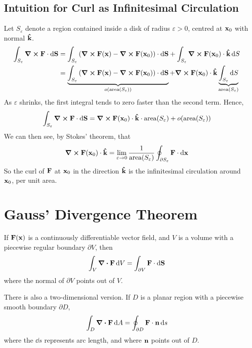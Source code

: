 \documentclass{article}
\begin{document}
\subsection{Intuition for Curl as Infinitesimal Circulation}
Let $S_\varepsilon$ denote a region contained inside a disk of radius $\varepsilon > 0$, centred at $\vb x_0$ with normal $\vu{k}$.
\begin{align*}
	\int_{S_\varepsilon} \curl{\vb F} \cdot \dd{\vb S} & = \int_{S_\varepsilon} \left( \curl{\vb F(\vb x)} - \curl{\vb F(\vb x_0)} \right) \cdot \dd{\vb S} + \int_{S_\varepsilon} \curl{\vb F(\vb x_0)} \cdot \vu k \dd{S}                                                                                        \\
	                                                   & = \underbrace{\int_{S_\varepsilon} \left( \curl{\vb F(\vb x)} - \curl{\vb F(\vb x_0)} \right) \cdot \dd{\vb S}}_{o(\text{area}(S_\varepsilon))} + \curl{\vb F(\vb x_0)} \cdot \vu k \underbrace{\int_{S_\varepsilon} \dd{S}}_{\text{area}(S_\varepsilon)} \\
\end{align*}
As $\varepsilon$ shrinks, the first integral tends to zero faster than the second term. Hence,
\[ \int_{S_\varepsilon} \curl{\vb F} \cdot \dd{\vb S} =  \curl{\vb F(\vb x_0)} \cdot \vu k \cdot \text{area}(S_\varepsilon) + o(\text{area}(S_\varepsilon)) \]
We can then see, by Stokes' theorem, that
\[ \curl{\vb F(\vb x_0)} \cdot \vu k = \lim_{\varepsilon \to 0} \frac{1}{\text{area}(S_\varepsilon)} \oint_{\partial S_\varepsilon} \vb F \cdot \dd{\vb x} \]
So the curl of $\vb F$ at $\vb x_0$ in the direction $\vu k$ is the infinitesimal circulation around $\vb x_0$, per unit area.

\section{Gauss' Divergence Theorem}
\begin{proposition}
	If $\vb F(\vb x)$ is a continuously differentiable vector field, and $V$ is a volume with a piecewise regular boundary $\partial V$, then
	\[ \int_V \div{\vb F} \dd{V} = \int_{\partial V} \vb F \cdot \dd{\vb S} \]
	where the normal of $\partial V$ points out of $V$.
\end{proposition}
\noindent There is also a two-dimensional version. If $D$ is a planar region with a piecewise smooth boundary $\partial D$,
\[ \int_D \div{\vb F} \dd{A} = \oint_{\partial D} \vb F \cdot \vb n \dd{s} \]
where the $\dd{s}$ represents arc length, and where $\vb n$ points out of $D$.
\end{document}
